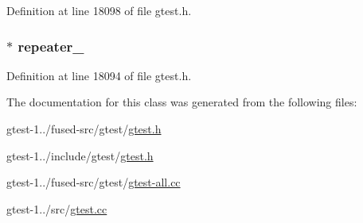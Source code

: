 \-Definition at line 18098 of file gtest.\-h.

\hypertarget{classtesting_1_1TestEventListeners_a11b237a644ef1266c8be236cfc2a7a68}{
\subsubsection[{repeater\-\_\-}]{ $\ast$ {\bf repeater\-\_\-}}}\label{db/d70/classtesting_1_1TestEventListeners_a11b237a644ef1266c8be236cfc2a7a68}


\-Definition at line 18094 of file gtest.\-h.



\-The documentation for this class was generated from the following files\-:\begin{DoxyCompactItemize}
\item 
gtest-\/1../fused-\/src/gtest/\hyperlink{fused-src_2gtest_2gtest_8h}{gtest.\-h}\item 
gtest-\/1../include/gtest/\hyperlink{include_2gtest_2gtest_8h}{gtest.\-h}\item 
gtest-\/1../fused-\/src/gtest/\hyperlink{fused-src_2gtest_2gtest-all_8cc}{gtest-\/all.\-cc}\item 
gtest-\/1../src/\hyperlink{gtest_8cc}{gtest.\-cc}\end{DoxyCompactItemize}
